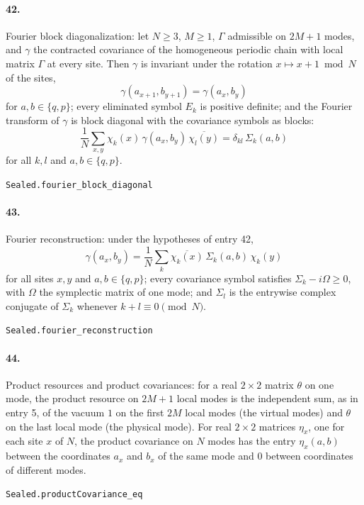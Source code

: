 \documentclass[11pt]{article}
\begin{document}
\paragraph{42.} Fourier block diagonalization: let $N \ge 3$, $M \ge 1$, $\Gamma$ admissible on $2M + 1$ modes, and $\gamma$ the contracted covariance of the homogeneous periodic chain with local matrix $\Gamma$ at every site. Then $\gamma$ is invariant under the rotation $x \mapsto x + 1 \bmod N$ of the sites, \[\gamma(a_{x+1}, b_{y+1}) = \gamma(a_x, b_y)\] for $a, b \in \{q, p\}$; every eliminated symbol $E_k$ is positive definite; and the Fourier transform of $\gamma$ is block diagonal with the covariance symbols as blocks: \[\frac1N \sum_{x, y} \chi_k(x)\, \gamma(a_x, b_y)\, \overline{\chi_l(y)} = \delta_{kl}\, \Sigma_k(a, b)\] for all $k, l$ and $a, b \in \{q, p\}$.\par{\footnotesize\texttt{Sealed.fourier\_block\_diagonal}}

\paragraph{43.} Fourier reconstruction: under the hypotheses of entry 42, \[\gamma(a_x, b_y) = \frac1N \sum_k \overline{\chi_k(x)}\, \Sigma_k(a, b)\, \chi_k(y)\] for all sites $x, y$ and $a, b \in \{q, p\}$; every covariance symbol satisfies $\Sigma_k - i\Omega \ge 0$, with $\Omega$ the symplectic matrix of one mode; and $\Sigma_l$ is the entrywise complex conjugate of $\Sigma_k$ whenever $k + l \equiv 0 \pmod N$.\par{\footnotesize\texttt{Sealed.fourier\_reconstruction}}

\paragraph{44.} Product resources and product covariances: for a real $2 \times 2$ matrix $\theta$ on one mode, the product resource on $2M + 1$ local modes is the independent sum, as in entry 5, of the vacuum $1$ on the first $2M$ local modes (the virtual modes) and $\theta$ on the last local mode (the physical mode). For real $2 \times 2$ matrices $\eta_x$, one for each site $x$ of $N$, the product covariance on $N$ modes has the entry $\eta_x(a, b)$ between the coordinates $a_x$ and $b_x$ of the same mode and $0$ between coordinates of different modes.\par{\footnotesize\texttt{Sealed.productCovariance\_eq}}
\end{document}
